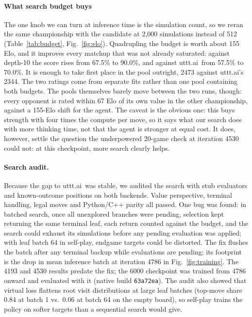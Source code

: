 \documentclass[conference]{IEEEtran}
\newcommand{\code}[1]{\texttt{#1}}
\newcommand{\utttai}{uttt.ai}
\begin{document}
\paragraph{What search budget buys}
The one knob we can turn at inference time is the simulation count, so we
reran the same championship with the candidate at 2{,}000 simulations
instead of 512 (Table~\ref{tab:budget}, Fig.~\ref{fig:elo}). Quadrupling the budget is worth
about 155 Elo, and it improves every matchup that was not already saturated:
against depth-10 the score rises from 67.5\% to 90.0\%, and against \utttai\
from 57.5\% to 70.0\%. It is enough to take first place in the pool outright,
2473 against \utttai's 2344. The two ratings come from separate fits rather
than one pool containing both budgets. The pools themselves barely move
between the two runs, though: every opponent is rated within 67 Elo of its
own value in the other championship, against a 155-Elo shift for the agent. The caveat is the obvious one: this
buys strength with four times the compute per move, so it says what our
search does with more thinking time, not that the agent is stronger at equal
cost. It does, however, settle the question the underpowered 20-game check
at iteration 4530 could not: at this checkpoint, more search clearly helps.

\paragraph{Search audit.}
Because the gap to \utttai\ was stable, we audited the search with stub
evaluators and known-outcome positions on both backends. Value
perspective, terminal handling, legal moves and Python/C++ parity all
passed. One bug was found: in batched search, once all unexplored branches
were pending, selection kept returning the same terminal leaf, each return
counted against the budget, and the search could exhaust its simulations
before any pending evaluation was applied; with leaf batch 64 in self-play,
endgame targets could be distorted. The fix flushes
the batch after any terminal backup while evaluations are pending; its
footprint is the drop in mean inference batch at iteration 4786 in
Fig.~\ref{fig:training}. The 4193 and 4530 results predate the fix; the
6000 checkpoint was trained from 4786 onward and evaluated with it (native
build \code{63a72ea}). The audit also showed that virtual loss flattens root visit distributions
at large leaf batches (top-move share 0.84 at batch 1 vs.\ 0.06 at batch
64 on the empty board), so self-play trains the policy on softer targets
than a sequential search would give.
\end{document}
